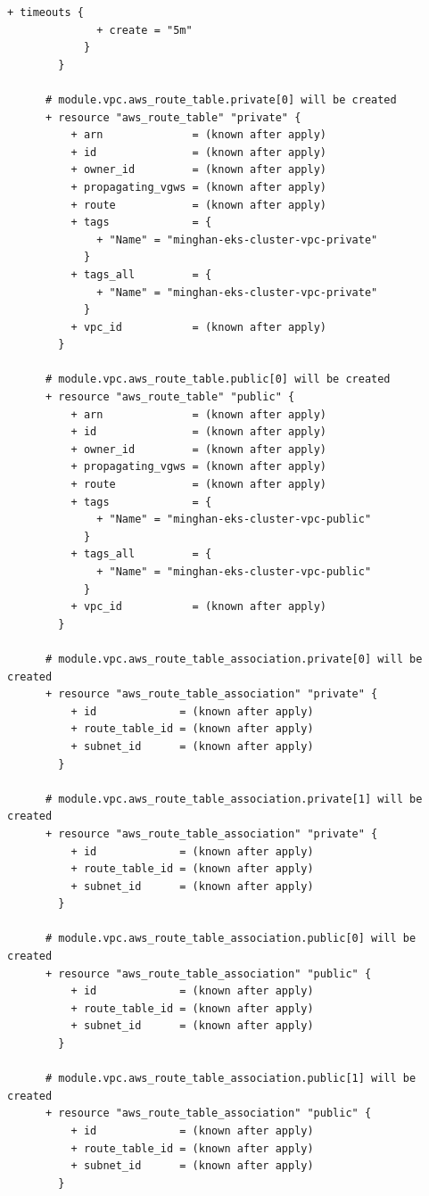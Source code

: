 \begin{lstlisting}[caption={terraform plan output for \texttt{cloudkube} provisioning}, breaklines=true, breakatwhitespace=false]
          + timeouts {
              + create = "5m"
            }
        }
    
      # module.vpc.aws_route_table.private[0] will be created
      + resource "aws_route_table" "private" {
          + arn              = (known after apply)
          + id               = (known after apply)
          + owner_id         = (known after apply)
          + propagating_vgws = (known after apply)
          + route            = (known after apply)
          + tags             = {
              + "Name" = "minghan-eks-cluster-vpc-private"
            }
          + tags_all         = {
              + "Name" = "minghan-eks-cluster-vpc-private"
            }
          + vpc_id           = (known after apply)
        }
    
      # module.vpc.aws_route_table.public[0] will be created
      + resource "aws_route_table" "public" {
          + arn              = (known after apply)
          + id               = (known after apply)
          + owner_id         = (known after apply)
          + propagating_vgws = (known after apply)
          + route            = (known after apply)
          + tags             = {
              + "Name" = "minghan-eks-cluster-vpc-public"
            }
          + tags_all         = {
              + "Name" = "minghan-eks-cluster-vpc-public"
            }
          + vpc_id           = (known after apply)
        }
    
      # module.vpc.aws_route_table_association.private[0] will be created
      + resource "aws_route_table_association" "private" {
          + id             = (known after apply)
          + route_table_id = (known after apply)
          + subnet_id      = (known after apply)
        }
    
      # module.vpc.aws_route_table_association.private[1] will be created
      + resource "aws_route_table_association" "private" {
          + id             = (known after apply)
          + route_table_id = (known after apply)
          + subnet_id      = (known after apply)
        }
    
      # module.vpc.aws_route_table_association.public[0] will be created
      + resource "aws_route_table_association" "public" {
          + id             = (known after apply)
          + route_table_id = (known after apply)
          + subnet_id      = (known after apply)
        }
    
      # module.vpc.aws_route_table_association.public[1] will be created
      + resource "aws_route_table_association" "public" {
          + id             = (known after apply)
          + route_table_id = (known after apply)
          + subnet_id      = (known after apply)
        }
    

\end{lstlisting}
